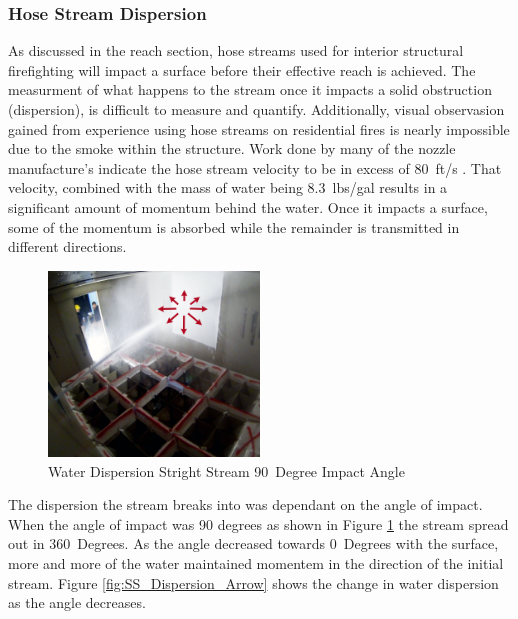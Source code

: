 \documentclass[12pt,oneside]{book}
\begin{document}
\subsubsection{Hose Stream Dispersion}

As discussed in the reach section, hose streams used for interior structural firefighting will impact a surface before their effective reach is achieved. The measurment of what happens to the stream once it impacts a solid obstruction (dispersion), is difficult to measure and quantify. Additionally, visual observasion gained from experience using hose streams on residential fires is nearly impossible due to the smoke within the structure. Work done by many of the nozzle manufacture's indicate the hose stream velocity to be in excess of 80~ft/s \cite{NBFU:EffectiveReach}. That velocity, combined with the mass of water being 8.3~lbs/gal \cite{SFPEHandbookPurser} results in a significant amount of momentum behind the water. Once it impacts a surface, some of the momentum is absorbed while the remainder is transmitted in different directions. 

\begin{figure}[H]
\centering
\includegraphics[width=0.5\textwidth]{Figures/Water_Distribution/Nozzle_Directions/Exterior_AtWall_SB_Arrows.png}
\caption{Water Dispersion Stright Stream 90~Degree Impact Angle}
\label{fig:90DegreeImpact}
\end{figure}

The dispersion the stream breaks into was dependant on the angle of impact. When the angle of impact was 90 degrees as shown in Figure \ref{fig:90DegreeImpact} the stream spread out in 360~Degrees. As the angle decreased towards 0~Degrees with the surface, more and more of the water maintained momentem in the direction of the initial stream. Figure \ref{fig:SS_Dispersion_Arrow} shows the change in water dispersion as the angle decreases. 
\end{document}
